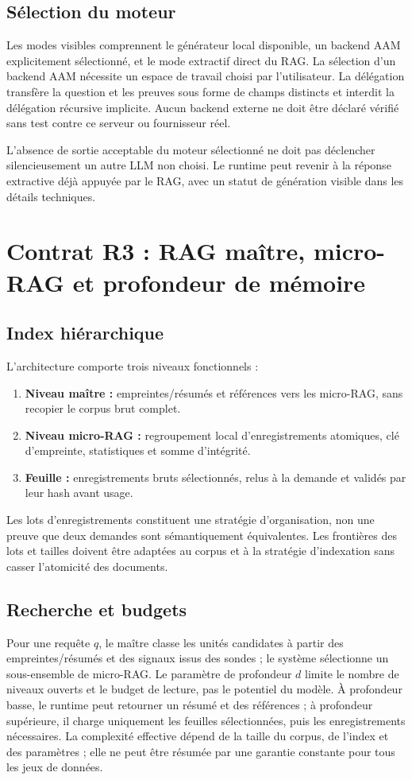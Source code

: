 \documentclass[11pt,a4paper]{article}
\begin{document}
\subsection{Sélection du moteur}
Les modes visibles comprennent le générateur local disponible, un backend AAM explicitement sélectionné, et le mode extractif direct du RAG. La sélection d'un backend AAM nécessite un espace de travail choisi par l'utilisateur. La délégation transfère la question et les preuves sous forme de champs distincts et interdit la délégation récursive implicite. Aucun backend externe ne doit être déclaré vérifié sans test contre ce serveur ou fournisseur réel.

L'absence de sortie acceptable du moteur sélectionné ne doit pas déclencher silencieusement un autre LLM non choisi. Le runtime peut revenir à la réponse extractive déjà appuyée par le RAG, avec un statut de génération visible dans les détails techniques.

\section{Contrat R3 : RAG maître, micro-RAG et profondeur de mémoire}
\subsection{Index hiérarchique}
L'architecture comporte trois niveaux fonctionnels :
\begin{enumerate}
\item \textbf{Niveau maître :} empreintes/résumés et références vers les micro-RAG, sans recopier le corpus brut complet.
\item \textbf{Niveau micro-RAG :} regroupement local d'enregistrements atomiques, clé d'empreinte, statistiques et somme d'intégrité.
\item \textbf{Feuille :} enregistrements bruts sélectionnés, relus à la demande et validés par leur hash avant usage.
\end{enumerate}
Les lots d'enregistrements constituent une stratégie d'organisation, non une preuve que deux demandes sont sémantiquement équivalentes. Les frontières des lots et tailles doivent être adaptées au corpus et à la stratégie d'indexation sans casser l'atomicité des documents.

\subsection{Recherche et budgets}
Pour une requête $q$, le maître classe les unités candidates à partir des empreintes/résumés et des signaux issus des sondes ; le système sélectionne un sous-ensemble de micro-RAG. Le paramètre de profondeur $d$ limite le nombre de niveaux ouverts et le budget de lecture, pas le potentiel du modèle. À profondeur basse, le runtime peut retourner un résumé et des références ; à profondeur supérieure, il charge uniquement les feuilles sélectionnées, puis les enregistrements nécessaires. La complexité effective dépend de la taille du corpus, de l'index et des paramètres ; elle ne peut être résumée par une garantie constante pour tous les jeux de données.
\end{document}
